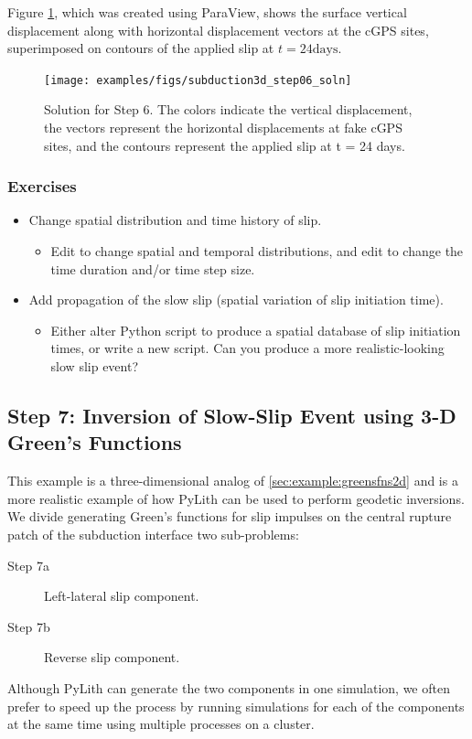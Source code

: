Figure \ref{fig:example:subduction:3d:step06}, which was created
using ParaView, shows the surface vertical displacement along with
horizontal displacement vectors at the cGPS sites, superimposed on
contours of the applied slip at $t = 24 \mathrm{days}$.

\begin{figure}
  \texttt{[image: examples/figs/subduction3d\_step06\_soln]}
  \caption{Solution for Step 6. The colors indicate the vertical
    displacement, the vectors represent the horizontal displacements
    at fake cGPS sites, and the contours represent the applied
    slip at t = 24 days.}
  \label{fig:example:subduction:3d:step06}
\end{figure}


\subsubsection{Exercises}

\begin{itemize}
\item Change spatial distribution and time history of slip.
  \begin{itemize}
  \item Edit  to change spatial and
    temporal distributions, and edit  to change the
    time duration and/or time step size.
  \end{itemize}
\item Add propagation of the slow slip (spatial variation of slip
  initiation time).
  \begin{itemize}
  \item Either alter Python script to produce a spatial database of
    slip initiation times, or write a new script. Can you produce a
    more realistic-looking slow slip event?
  \end{itemize}
\end{itemize}

\subsection{Step 7: Inversion of Slow-Slip Event using 3-D Green's Functions}

This example is a three-dimensional analog of
\vref{sec:example:greensfns2d} and is a more realistic example of how
PyLith can be used to perform geodetic inversions. We divide
generating Green's functions for slip impulses on the central rupture
patch of the subduction interface two sub-problems:
\begin{description}
 \item[Step 7a] Left-lateral slip component.
 \item[Step 7b] Reverse slip component.
\end{description}
Although PyLith can generate the two components in one simulation, we
often prefer to speed up the process by running simulations for each
of the components at the same time using multiple processes on a cluster.

